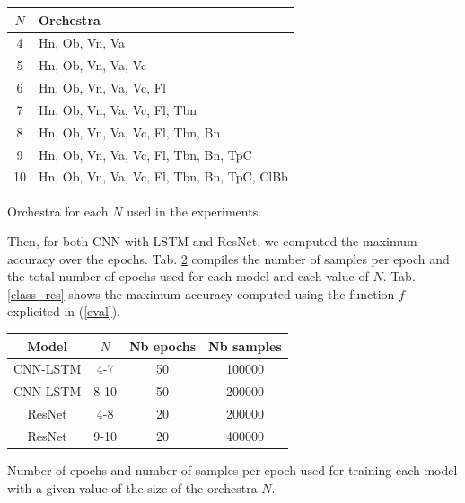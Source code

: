 \documentclass{article}
\begin{document}
\begin{table}
\begin{tabular}{|c|l|}
\hline
$N$ & Orchestra\\
\hline
4 & Hn, Ob, Vn, Va\\
5 & Hn, Ob, Vn, Va, Vc\\
6 & Hn, Ob, Vn, Va, Vc, Fl\\
7 & Hn, Ob, Vn, Va, Vc, Fl, Tbn\\
8 & Hn, Ob, Vn, Va, Vc, Fl, Tbn, Bn\\
9 & Hn, Ob, Vn, Va, Vc, Fl, Tbn, Bn, TpC\\
10 & Hn, Ob, Vn, Va, Vc, Fl, Tbn, Bn, TpC, ClBb\\
\hline
\end{tabular}

\begin{caption}
Orchestra for each $N$ used in the experiments.
\label{exp_tab}
\end{caption}
\end{table}

Then, for both CNN with LSTM and ResNet, we computed the maximum accuracy over the epochs. Tab. \ref{epoch} compiles the number of samples per epoch and the total number of epochs used for each model and each value of $N$. Tab. \ref{class_res} shows the maximum accuracy computed using the function $f$ explicited in (\ref{eval}).



\begin{table}
\begin{tabular}{|c|c|c|c|}
\hline
Model & $N$ & Nb epochs & Nb samples\\
\hline
CNN-LSTM & 4-7 & 50 & 100000 \\
CNN-LSTM & 8-10 & 50 & 200000 \\
ResNet & 4-8 & 20 & 200000 \\
ResNet & 9-10 & 20 & 400000 \\
\hline
\end{tabular}

\begin{caption}
Number of epochs and number of samples per epoch used for training each model with a given value of the size of the orchestra $N$.
\label{epoch}
\end{caption}
\end{table}
\end{document}

